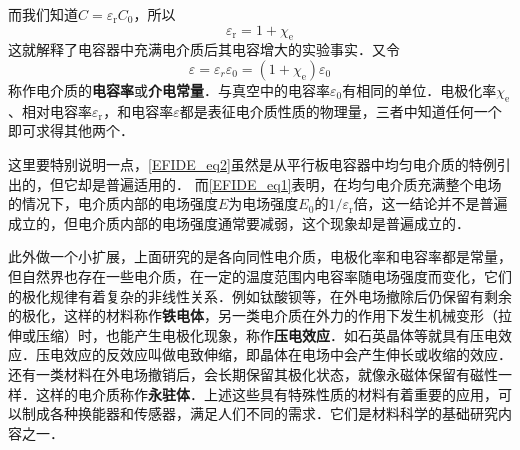 而我们知道$C=\varepsilon_\mathrm{r}C_0$，所以
\begin{equation} \label{EFIDE_eq2}
\varepsilon_{\mathrm{r}}=1+\chi_{\mathrm{e}}
\end{equation}
这就解释了电容器中充满电介质后其电容增大的实验事实．又令
\begin{equation}
\varepsilon=\varepsilon_{r} \varepsilon_{0}=\left(1+\chi_{\mathrm{e}}\right) \varepsilon_{0}
\end{equation}
称作电介质的\textbf{电容率}或\textbf{介电常量}．与真空中的电容率$\varepsilon_0$有相同的单位．电极化率$\chi_{\mathrm{e}}$、相对电容率$\varepsilon_\mathrm{r}$，和电容率$\varepsilon$都是表征电介质性质的物理量，三者中知道任何一个即可求得其他两个．

这里要特别说明一点，\autoref{EFIDE_eq2}虽然是从平行板电容器中均匀电介质的特例引出的，但它却是普遍适用的．
而\autoref{EFIDE_eq1}表明，在均匀电介质充满整个电场的情况下，电介质内部的电场强度$E $为电场强度$E_0$的$1/\varepsilon_{\mathrm{r}}$倍，这一结论并不是普遍成立的，但电介质内部的电场强度通常要减弱，这个现象却是普遍成立的．

此外做一个小扩展，上面研究的是各向同性电介质，电极化率和电容率都是常量，但自然界也存在一些电介质，在一定的温度范围内电容率随电场强度而变化，它们的极化规律有着复杂的非线性关系．例如钛酸钡等，在外电场撤除后仍保留有剩余的极化，这样的材料称作\textbf{铁电体}，另一类电介质在外力的作用下发生机械变形（拉伸或压缩）时，也能产生电极化现象，称作\textbf{压电效应}．如石英晶体等就具有压电效应．压电效应的反效应叫做电致伸缩，即晶体在电场中会产生伸长或收缩的效应．还有一类材料在外电场撤销后，会长期保留其极化状态，就像永磁体保留有磁性一样．这样的电介质称作\textbf{永驻体}．上述这些具有特殊性质的材料有着重要的应用，可以制成各种换能器和传感器，满足人们不同的需求．它们是材料科学的基础研究内容之一．
